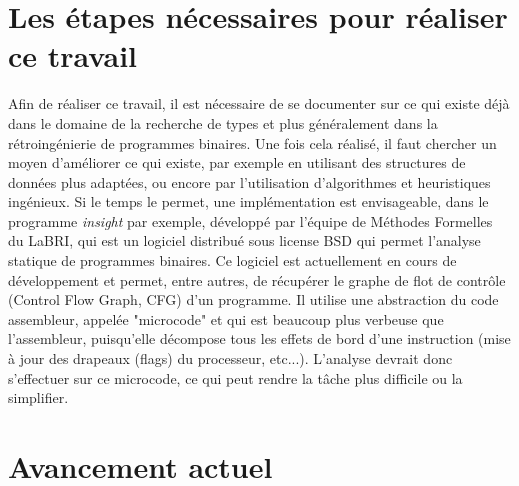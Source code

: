 \documentclass[a4paper,12pt]{article}
\begin{document}
\section{Les étapes nécessaires pour réaliser ce travail}

Afin de réaliser ce travail, il est nécessaire de se documenter sur ce qui
existe déjà dans le domaine de la recherche de types et plus généralement
dans la rétroingénierie de programmes binaires. Une fois cela réalisé,
il faut chercher un moyen d'améliorer ce qui existe, par exemple en
utilisant des structures de données plus adaptées, ou encore par
l'utilisation d'algorithmes et heuristiques ingénieux. Si le temps le permet,
une implémentation est envisageable, dans le programme \textit{insight} par 
exemple, développé par l'équipe de Méthodes Formelles du LaBRI, qui est
un logiciel distribué sous license BSD qui permet l'analyse statique de
programmes binaires. Ce logiciel est actuellement en cours de développement
et permet, entre autres, de récupérer le graphe de flot de contrôle
(Control Flow Graph, CFG) d'un programme. Il utilise une abstraction du code
assembleur, appelée "microcode" et qui est beaucoup plus verbeuse que
l'assembleur, puisqu'elle décompose tous les effets de bord d'une instruction
(mise à jour des drapeaux (flags) du processeur, etc...). L'analyse
devrait donc s'effectuer sur ce microcode, ce qui peut rendre la tâche
plus difficile ou la simplifier. 


\section{Avancement actuel}
\end{document}
